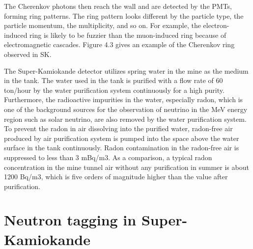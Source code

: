 The Cherenkov photons then reach the wall and are detected by the PMTs, forming ring patterns.
The ring pattern looks different by the particle type, the particle momentum, the multiplicity, and so on.
For example, the electron-induced ring is likely to be fuzzier than the muon-induced ring because of electromagnetic cascades.
Figure 4.3 gives an example of the Cherenkov ring observed in SK.

The Super-Kamiokande detector utilizes spring water in the mine as the medium in the tank.
The water used in the tank is purified with a flow rate of 60 ton/hour by the water purification %
system continuously for a high purity.
Furthermore, the radioactive impurities in the water, especially radon, which is one of the background sources for
the observation of neutrino in the MeV energy region such as solar neutrino, are also
removed by the water purification system.
To prevent the radon in air dissolving into the purified water, radon-free air produced
by air purification system is pumped into the space above the water surface in the
tank continuously. Radon contamination in the radon-free air is suppressed to less
than 3 mBq/m3.
As a comparison, a typical radon concentration in the mine tunnel air without any purification %
in summer is about 1200 Bq/m3, which is five orders of magnitude higher than the value after purification.

\section{Neutron tagging in Super-Kamiokande}

